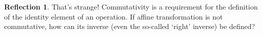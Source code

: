 \documentclass[english,notitlepage,smartquotes]{hgbreport}
\theoremstyle{definition}
\theoremstyle{definition}
\theoremstyle{remark}
\theoremstyle{plain}
\theoremstyle{definition}
\theoremstyle{definition}
\newtheorem{reflection}{Reflection}
\begin{document}
\begin{reflection}
That's strange! Commutativity is a requirement for the definition of the identity element of an operation. If affine transformation is not commutative, how can its inverse (even the so-called `right' inverse) be defined?
\end{reflection}

\MakeBibliography[nosplit]

\end{document}
